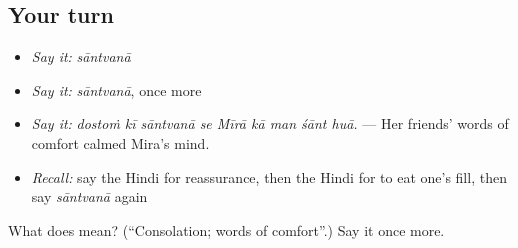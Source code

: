 \subsection*{Your turn}
\begin{itemize}
\raggedright
  \item \emph{Say it:} \emph{sāntvanā}
  \item \emph{Say it:} \emph{sāntvanā}, once more
  \item \emph{Say it:} \emph{dostoṁ kī sāntvanā se Mīrā kā man śānt huā.} — Her friends' words of comfort calmed Mira's mind.
  \item \emph{Recall:} say the Hindi for reassurance, then the Hindi for to eat one's fill, then say \emph{sāntvanā} again
\end{itemize}

\begin{tcolorbox}[breakable,colback=teal!4,colframe=teal!35!black,title={Before you move on}]
What does  mean? (\textquotedblleft{}Consolation; words of comfort\textquotedblright{}.) Say it once more.
\end{tcolorbox}
